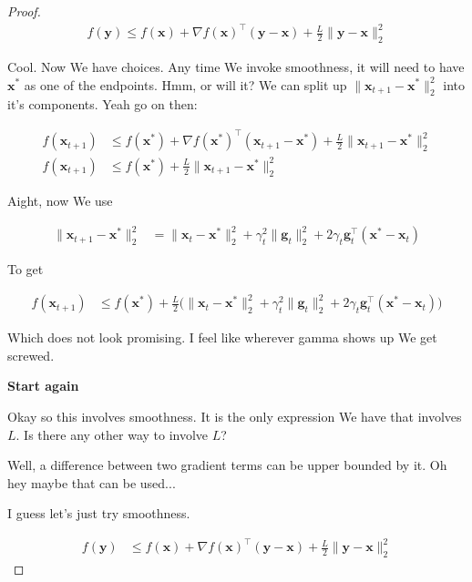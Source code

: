 \documentclass{article}
\begin{document}
\begin{proof}
	\begin{align}
		f(\mathbf{y})\le f(\mathbf{x}) + \nabla f(\mathbf{x})^\top(\mathbf{y}-\mathbf{x}) + \frac{L}{2}\|\mathbf{y}-\mathbf{x}\|^2_2
	\end{align}
	
	Cool. Now We have choices. Any time We invoke smoothness, it will need to have $\mathbf{x}^*$ as one of the endpoints. Hmm, or will it? We can split up $\|\mathbf{x}_{t+1} - \mathbf{x}^*\|^2_2$ into it's components. Yeah go on then:
	
	\begin{align}
		f(\mathbf{x}_{t+1}) &\le f(\mathbf{x}^*) + \nabla f(\mathbf{x}^*)^\top(\mathbf{x}_{t+1}-\mathbf{x}^*) + \frac{L}{2}\|\mathbf{x}_{t+1}-\mathbf{x}^*\|^2_2\\
		f(\mathbf{x}_{t+1}) &\le f(\mathbf{x}^*)  + \frac{L}{2}\|\mathbf{x}_{t+1}-\mathbf{x}^*\|^2_2
	\end{align}
	
	Aight, now We use 
	
	\begin{align}
		\| \mathbf{x}_{t+1} - \mathbf{x}^*\|^2_2  &= \|\mathbf{x}_t-\mathbf{x}^*\|^2_2 + \gamma_t^2\| \mathbf{g}_t\|^2_2 + 2\gamma_t \mathbf{g}_t^\top (\mathbf{x}^* - \mathbf{x}_t)
	\end{align}
	
	To get
	
	\begin{align}
		f(\mathbf{x}_{t+1}) &\le f(\mathbf{x}^*)  + \frac{L}{2}\big(\|\mathbf{x}_t-\mathbf{x}^*\|^2_2 + \gamma_t^2\| \mathbf{g}_t\|^2_2 + 2\gamma_t \mathbf{g}_t^\top (\mathbf{x}^* - \mathbf{x}_t)\big)
	\end{align}
	
	Which does not look promising. I feel like wherever gamma shows up We get screwed.
	
	\textbf{Start again}
	
	Okay so this involves smoothness. It is the only expression We have that involves $L$. Is there any other way to involve $L$? 
	
	Well, a difference between two gradient terms can be upper bounded by it. Oh hey maybe that can be used...
	
	I guess let's just try smoothness. 
	
	\begin{align}
		f(\mathbf{y}) &\le f(\mathbf{x}) + \nabla f(\mathbf{x})^\top(\mathbf{y}-\mathbf{x}) + \frac{L}{2}\|\mathbf{y}-\mathbf{x}\|^2_2
	\end{align}
	

\end{proof}
\end{document}
